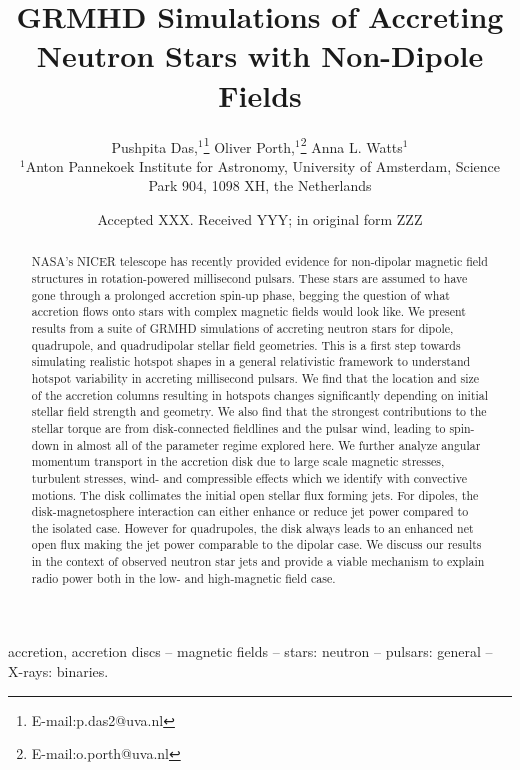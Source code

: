 \documentclass[fleqn,usenatbib]{mnras}
\title[Non-dipolar neutron star accretion in GRMHD]{GRMHD Simulations of Accreting Neutron Stars with Non-Dipole Fields}
\author[Das et al.]{
Pushpita Das,$^{1}$\thanks{E-mail:p.das2@uva.nl}
Oliver Porth,$^{1}$\thanks{E-mail:o.porth@uva.nl}
Anna L. Watts$^{1}$
\\
$^{1}$Anton Pannekoek Institute for Astronomy, University of Amsterdam, Science Park 904, 1098 XH, the Netherlands\\
}
\date{Accepted XXX. Received YYY; in original form ZZZ}
\begin{document}
\label{firstpage}
\pagerange{\pageref{firstpage}--\pageref{lastpage}}
\maketitle

\begin{abstract}
NASA’s NICER telescope has recently provided evidence for non-dipolar magnetic field structures in rotation-powered millisecond pulsars. These stars are assumed to have gone through a prolonged accretion spin-up phase, begging the question of what accretion flows onto stars with complex magnetic fields would look like. We present results from a suite of GRMHD simulations of accreting neutron stars for dipole, quadrupole, and quadrudipolar stellar field geometries. This is a first step towards simulating realistic hotspot shapes in a general relativistic framework to understand hotspot variability in accreting millisecond pulsars. We find that the location and size of the accretion columns resulting in hotspots changes significantly depending on initial stellar field strength and geometry. We also find that the strongest contributions to the stellar torque are from disk-connected fieldlines and the pulsar wind, leading to spin-down in almost all of the parameter regime explored here. We further analyze angular momentum transport in the accretion disk due to large scale magnetic stresses, turbulent stresses, wind- and compressible effects which we identify with convective motions. The disk collimates the initial open stellar flux forming jets. For dipoles, the disk-magnetosphere interaction can either enhance or reduce jet power compared to the isolated case. However for quadrupoles, the disk always leads to an enhanced net open flux making the jet power comparable to the dipolar case. We discuss our results in the context of observed neutron star jets and provide a viable mechanism to explain radio power both in the low- and high-magnetic field case.
\end{abstract}

\begin{keywords}
accretion, accretion discs – magnetic fields – stars: neutron – pulsars: general –
X-rays: binaries.
\end{keywords}


\end{document}
